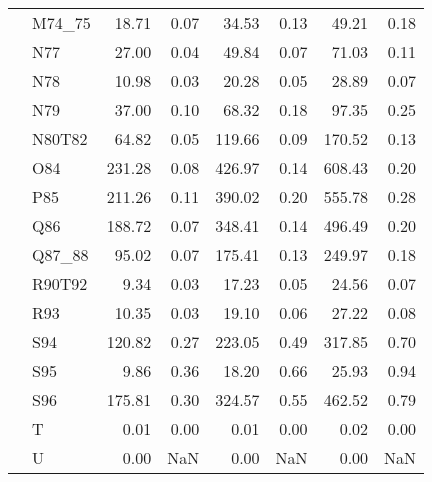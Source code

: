 \begin{tabular}{llrrrrrr}
 & M74\_75 & 18.71 & 0.07 & 34.53 & 0.13 & 49.21 & 0.18 \\
 & N77 & 27.00 & 0.04 & 49.84 & 0.07 & 71.03 & 0.11 \\
 & N78 & 10.98 & 0.03 & 20.28 & 0.05 & 28.89 & 0.07 \\
 & N79 & 37.00 & 0.10 & 68.32 & 0.18 & 97.35 & 0.25 \\
 & N80T82 & 64.82 & 0.05 & 119.66 & 0.09 & 170.52 & 0.13 \\
 & O84 & 231.28 & 0.08 & 426.97 & 0.14 & 608.43 & 0.20 \\
 & P85 & 211.26 & 0.11 & 390.02 & 0.20 & 555.78 & 0.28 \\
 & Q86 & 188.72 & 0.07 & 348.41 & 0.14 & 496.49 & 0.20 \\
 & Q87\_88 & 95.02 & 0.07 & 175.41 & 0.13 & 249.97 & 0.18 \\
 & R90T92 & 9.34 & 0.03 & 17.23 & 0.05 & 24.56 & 0.07 \\
 & R93 & 10.35 & 0.03 & 19.10 & 0.06 & 27.22 & 0.08 \\
 & S94 & 120.82 & 0.27 & 223.05 & 0.49 & 317.85 & 0.70 \\
 & S95 & 9.86 & 0.36 & 18.20 & 0.66 & 25.93 & 0.94 \\
 & S96 & 175.81 & 0.30 & 324.57 & 0.55 & 462.52 & 0.79 \\
 & T & 0.01 & 0.00 & 0.01 & 0.00 & 0.02 & 0.00 \\
 & U & 0.00 & NaN & 0.00 & NaN & 0.00 & NaN \\
\cline{1-8}
\bottomrule
\end{tabular}
